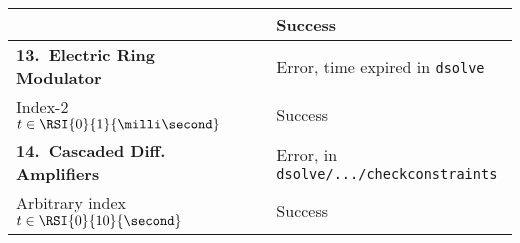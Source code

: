 {\begin{longtable}{lccl}
    & \Indigo{} & \mycheckmark{}\phantom{\mywarnmark{}} & Success \\ \midrule
  \multirow{1}{*}{\textbf{13.~Electric Ring Modulator}} %
    & \Maple{}  & \mycrossmark{}\phantom{\mywarnmark{}} & Error, time expired in \texttt{dsolve} \\ \cmidrule{2-4}
    Index-2 \quad $t \in \RSI{0}{1}{\milli\second}$ & \Indigo{} & \mycheckmark{}\phantom{\mywarnmark{}} & Success \\ \midrule
  \multirow{1}{*}{\textbf{14.~Cascaded Diff. Amplifiers}} %
    & \Maple{}  & \mycrossmark{}\phantom{\mywarnmark{}} & Error, in \texttt{dsolve/.../checkconstraints} \\ \cmidrule{2-4}
    Arbitrary index \quad $t \in \RSI{0}{10}{\second}$ & \Indigo{} & \mycheckmark{}\phantom{\mywarnmark{}} & Success \\
  \bottomrule
\end{longtable}}